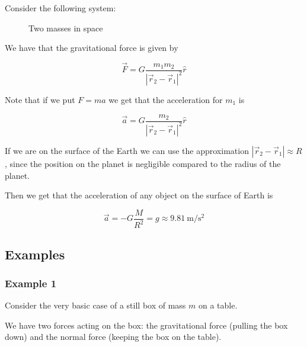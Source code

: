 \documentclass[10pt]{extarticle}
\begin{document}
Consider the following system:

\begin{figure}[H]
    \centering

    \caption{Two masses in space}
    \label{fig:gravforce_masses}
\end{figure}

We have that the gravitational force is given by

$$
    \vec F = G \frac{ m_1 m_2}{|\vec r_2 - \vec r_1|^2} \hat r
$$

Note that if we put $F = ma$ we get that the acceleration for $m_1$ is

$$
    \vec a = G \frac{m_2}{|\vec r_2 - \vec r_1|^2} \hat r
$$

If we are on the surface of the Earth we can use the approximation $|\vec r_2 - \vec r_1| \approx R$, since the position on the planet is negligible compared to the radius of the planet.

Then we get that the acceleration of any object on the surface of Earth is

$$
    \vec a = - G \frac{M}{R^2} = g \approx \SI{9.81}{\meter \per \second \squared}
$$

\subsection{Examples}

\subsubsection{Example 1}

Consider the very basic case of a still box of mass $m$ on a table.

We have two forces acting on the box: the gravitational force (pulling the box down) and the normal force (keeping the box on the table).
\end{document}
